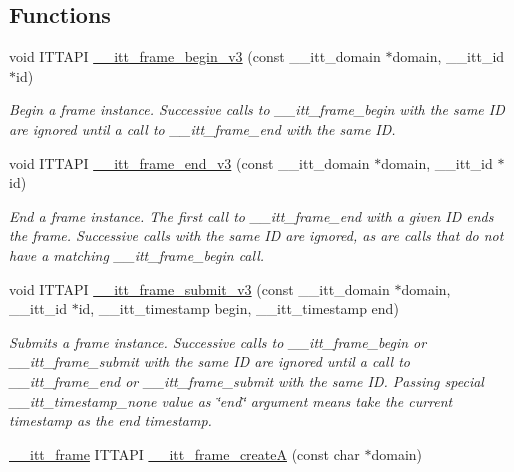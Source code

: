 \subsection*{Functions}
\begin{DoxyCompactItemize}
\item 
void I\+T\+T\+A\+P\+I \hyperlink{group__frames_ga093acc1a6ba76656835ddf17776d7ff3}{\+\_\+\+\_\+itt\+\_\+frame\+\_\+begin\+\_\+v3} (const \+\_\+\+\_\+itt\+\_\+domain $\ast$domain, \+\_\+\+\_\+itt\+\_\+id $\ast$id)
\begin{DoxyCompactList}\small\item\em Begin a frame instance. Successive calls to \+\_\+\+\_\+itt\+\_\+frame\+\_\+begin with the same I\+D are ignored until a call to \+\_\+\+\_\+itt\+\_\+frame\+\_\+end with the same I\+D. \end{DoxyCompactList}\item 
void I\+T\+T\+A\+P\+I \hyperlink{group__frames_ga04806851f8db36359587c111defde4e3}{\+\_\+\+\_\+itt\+\_\+frame\+\_\+end\+\_\+v3} (const \+\_\+\+\_\+itt\+\_\+domain $\ast$domain, \+\_\+\+\_\+itt\+\_\+id $\ast$id)
\begin{DoxyCompactList}\small\item\em End a frame instance. The first call to \+\_\+\+\_\+itt\+\_\+frame\+\_\+end with a given I\+D ends the frame. Successive calls with the same I\+D are ignored, as are calls that do not have a matching \+\_\+\+\_\+itt\+\_\+frame\+\_\+begin call. \end{DoxyCompactList}\item 
void I\+T\+T\+A\+P\+I \hyperlink{group__frames_ga18b8adc466f67480f699e5caa1889b81}{\+\_\+\+\_\+itt\+\_\+frame\+\_\+submit\+\_\+v3} (const \+\_\+\+\_\+itt\+\_\+domain $\ast$domain, \+\_\+\+\_\+itt\+\_\+id $\ast$id, \+\_\+\+\_\+itt\+\_\+timestamp begin, \+\_\+\+\_\+itt\+\_\+timestamp end)
\begin{DoxyCompactList}\small\item\em Submits a frame instance. Successive calls to \+\_\+\+\_\+itt\+\_\+frame\+\_\+begin or \+\_\+\+\_\+itt\+\_\+frame\+\_\+submit with the same I\+D are ignored until a call to \+\_\+\+\_\+itt\+\_\+frame\+\_\+end or \+\_\+\+\_\+itt\+\_\+frame\+\_\+submit with the same I\+D. Passing special \+\_\+\+\_\+itt\+\_\+timestamp\+\_\+none value as \char`\"{}end\char`\"{} argument means take the current timestamp as the end timestamp. \end{DoxyCompactList}\item 
\hypertarget{group__frames_ga8b106f002c9f1ed6e17d5833e8200ff0}{}\hyperlink{group__frames_gad1b74516ce88dc28bff032244625c7c2}{\+\_\+\+\_\+itt\+\_\+frame} I\+T\+T\+A\+P\+I \hyperlink{group__frames_ga8b106f002c9f1ed6e17d5833e8200ff0}{\+\_\+\+\_\+itt\+\_\+frame\+\_\+create\+A} (const char $\ast$domain)\label{group__frames_ga8b106f002c9f1ed6e17d5833e8200ff0}


\end{DoxyCompactItemize}
